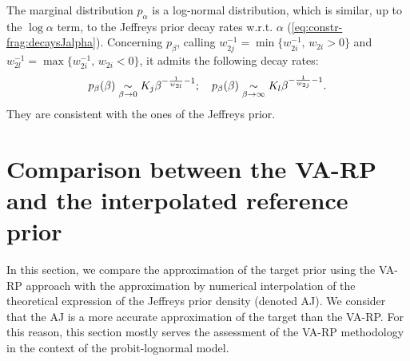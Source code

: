 The marginal distribution $p_\alpha$ is a log-normal distribution, which is similar, up to the $\log \alpha$ term, to the Jeffreys prior decay rates w.r.t. $\alpha$ (\cref{eq:constr-frag:decaysJalpha}).  Concerning $p_\beta$, calling $w_{2j}^{-1}=\min\{w_{2i}^{-1},\,w_{2i}>0\}$ and $w_{2l}^{-1}=\max\{w_{2i}^{-1},\,w_{2i}<0\}$, 
it admits the following decay rates:
\begin{equation}
    p_\beta(\beta)\underset{\beta\rightarrow0}{\sim} K_j\beta^{-\frac{1}{w_{2l}}-1};\quad p_\beta(\beta)\underset{\beta\rightarrow\infty}{\sim} K_l\beta^{-\frac{1}{w_{2j}}-1}.
    \label{eq:palphabeta}
\end{equation}
They are consistent with the ones of the Jeffreys prior. %























\section{Comparison between the VA-RP and the interpolated reference prior}\label{sec:constr-frags:coparisonpriors}



In this section, we compare the approximation of the target prior using the VA-RP approach with the approximation by numerical interpolation of the theoretical expression of the Jeffreys prior density (denoted AJ).
We consider that the AJ is a more accurate approximation of the target than the VA-RP. For this reason, this section mostly serves the assessment of the VA-RP methodology in the context of the probit-lognormal model.


